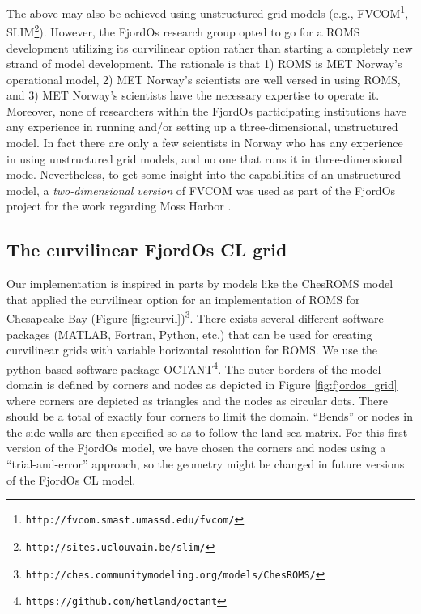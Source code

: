 The above may also be achieved using unstructured grid models (e.g., FVCOM\footnote{\texttt{http://fvcom.smast.umassd.edu/fvcom/}}, SLIM\footnote{\texttt{http://sites.uclouvain.be/slim/}}). However, the FjordOs research group opted to go for a ROMS development utilizing its curvilinear option rather than starting a completely new strand of model development. The rationale is that 1) ROMS is MET Norway's operational model, 2) MET Norway's scientists are well versed in using ROMS, and 3) MET Norway's scientists have the necessary expertise to operate it. Moreover, none of researchers within the FjordOs participating institutions have any experience in running and/or setting up a three-dimensional, unstructured model. In fact there are only a few scientists in Norway who has any experience in using unstructured grid models, and no one that runs it in three-dimensional mode. Nevertheless, to get some insight into the capabilities of an unstructured model, a \emph{two-dimensional version} of FVCOM was used as part of the FjordOs project for the work regarding Moss Harbor \citep{hjelm:etal:2014}.  
   

\subsection{The curvilinear FjordOs CL grid}
Our implementation is inspired in parts by models like the ChesROMS model that applied the curvilinear option for an implementation of ROMS for Chesapeake Bay (Figure \ref{fig:curvil})\footnote{\texttt{http://ches.communitymodeling.org/models/ChesROMS/}}. There exists several different software packages (MATLAB, Fortran, Python, etc.) that can be used for creating curvilinear grids with variable horizontal resolution for ROMS. We use the python-based software package OCTANT\footnote{\texttt{https://github.com/hetland/octant}}. The outer borders of the model domain is defined by corners and nodes as depicted in Figure \ref{fig:fjordos_grid} where corners are depicted as triangles and the nodes as circular dots. There should be a total of exactly four corners to limit the domain. ``Bends'' or nodes in the side walls are then specified so as to follow the land-sea matrix. For this first version of the FjordOs model, we have chosen the corners and nodes using a ``trial-and-error'' approach, so the geometry might be changed in future versions of the FjordOs CL model.


